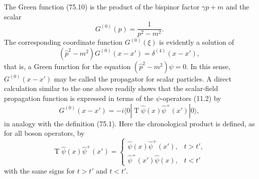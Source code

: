 The Green function (75.10) is the product of the bispinor factor $\gamma p+m$ and the scalar
\begin{equation}
G^{(0)}(p)=\frac{1}{p^2-m^2}.
\tag{75.20}
\end{equation}
The corresponding coordinate function $G^{(0)}(\xi)$ is evidently a solution of
\begin{equation}
(\hat p^2-m^2)G^{(0)}(x-x')=\delta^{(4)}(x-x'),
\tag{75.21}
\end{equation}
that is, a Green function for the equation $(\hat p^2-m^2)\psi=0$. In this sense, $G^{(0)}(x-x')$ may be called the propagator for scalar particles. A direct calculation similar to the one above readily shows that the scalar-field propagation function is expressed in terms of the $\psi$-operators (11.2) by
\begin{equation}
G^{(0)}(x-x')=-i\langle0|\mathop{\mathrm T}\hat\psi(x)\hat\psi^+(x')|0\rangle,
\tag{75.22}
\end{equation}
in analogy with the definition (75.1). Here the chronological product is defined, as for all boson operators, by
\begin{equation}
\mathop{\mathrm T}\hat\psi(x)\hat\psi^+(x')=
\begin{cases}
\hat\psi(x)\hat\psi^+(x'),&t>t',\\
\hat\psi^+(x')\hat\psi(x),&t<t'
\end{cases}
\tag{75.23}
\end{equation}
with the same signs for $t>t'$ and $t<t'$.
